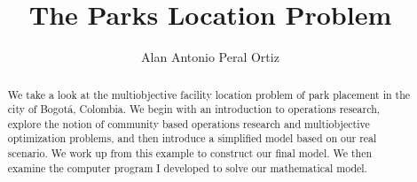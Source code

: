\documentclass[12pt]{pom_thesis}
\author{Alan Antonio Peral Ortiz}
\title{The Parks Location Problem}
\theoremstyle{definition}
\begin{document}


\maketitle

\begin{abstract}We take a look at the multiobjective facility location problem of park placement in the city of Bogot\'{a}, Colombia. We begin with an introduction to operations research, explore the notion of community based operations research and multiobjective optimization problems, and then introduce a simplified model based on our real scenario. We work up from this example to construct our final model. We then examine the computer program I developed to solve our mathematical model.
\end{abstract}
\end{document}
